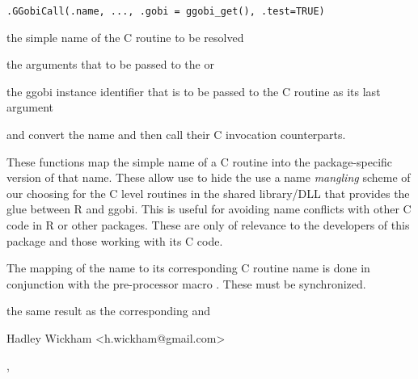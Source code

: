 \begin{Description}\relax
\end{Description}
\begin{Usage}
\begin{verbatim}.GGobiCall(.name, ..., .gobi = ggobi_get(), .test=TRUE)\end{verbatim}
\end{Usage}
\begin{Arguments}
\begin{ldescription}
\item[\code{.name}] the simple name of the C routine to be resolved
\item[\code{...}] the arguments that to be passed to the  or 
\item[\code{.gobi}] the ggobi instance identifier that is to be passed to the C routine as its last argument
\item[\code{.test}] 
\end{ldescription}
\end{Arguments}
\begin{Details}\relax
{} and  convert the name and then call
their C invocation counterparts.

These functions map the simple name of a C routine into the
package-specific version of that name.  These allow use to hide the
use a name \textit{mangling} scheme of our choosing for the C level
routines in the shared library/DLL that provides the glue between R
and ggobi.  This is useful for avoiding name conflicts with other C
code in R or other packages.  These are only of relevance to the
developers of this package and those working with its C code.

The mapping of the name to its corresponding C routine name
is done in conjunction with the pre-processor macro
. These  must be synchronized.
\end{Details}
\begin{Value}
the same result as the corresponding  and 
\end{Value}
\begin{Author}\relax
Hadley Wickham <h.wickham@gmail.com>
\end{Author}
\begin{SeeAlso}\relax
{}, 
\end{SeeAlso}
\begin{Examples}
\begin{ExampleCode}\end{ExampleCode}
\end{Examples}

